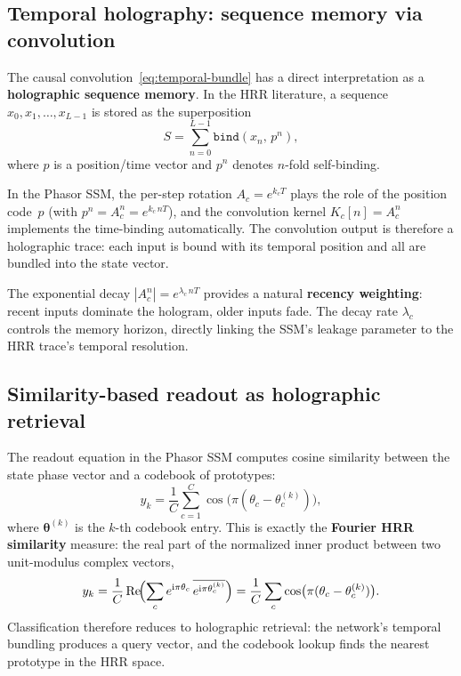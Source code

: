 \documentclass[11pt]{article}
\newcommand{\im}{\mathrm{i}}
\theoremstyle{definition}
\begin{document}
\subsection{Temporal holography: sequence memory via convolution}

The causal convolution~\eqref{eq:temporal-bundle} has a direct
interpretation as a \textbf{holographic sequence memory}.
In the HRR literature, a sequence $x_0, x_1, \dots, x_{L-1}$
is stored as the superposition
\begin{equation}\label{eq:hrr-trace}
  S = \sum_{n=0}^{L-1} \texttt{bind}(x_n,\, p^n),
\end{equation}
where $p$ is a position/time vector and $p^n$ denotes $n$-fold
self-binding.

In the Phasor SSM, the per-step rotation $A_c = e^{k_c T}$ plays the
role of the position code~$p$ (with $p^n = A_c^n = e^{k_c\,nT}$),
and the convolution kernel $K_c[n] = A_c^n$ implements the
time-binding automatically. The convolution output is therefore
a holographic trace: each input is bound with its temporal position
and all are bundled into the state vector.

The exponential decay $|A_c^n| = e^{\lambda_c\,nT}$ provides a
natural \textbf{recency weighting}: recent inputs dominate the
hologram, older inputs fade. The decay rate $\lambda_c$ controls
the memory horizon, directly linking the SSM's leakage parameter
to the HRR trace's temporal resolution.

\subsection{Similarity-based readout as holographic retrieval}

The readout equation in the Phasor SSM computes cosine similarity
between the state phase vector and a codebook of prototypes:
\begin{equation}\label{eq:similarity-readout}
  y_k = \frac{1}{C}\sum_{c=1}^{C}
    \cos\!\bigl(\pi(\theta_c - \theta_c^{(k)})\bigr),
\end{equation}
where $\bm\theta^{(k)}$ is the $k$-th codebook entry.
This is exactly the \textbf{Fourier HRR similarity} measure:
the real part of the normalized inner product between two unit-modulus
complex vectors,
\[
  y_k = \frac{1}{C}\operatorname{Re}\!\Bigl(
    \sum_c e^{\im\pi\theta_c}\,\overline{e^{\im\pi\theta_c^{(k)}}}
  \Bigr)
  = \frac{1}{C}\sum_c \cos\bigl(\pi(\theta_c - \theta_c^{(k)})\bigr).
\]
Classification therefore reduces to holographic retrieval:
the network's temporal bundling produces a query vector, and the
codebook lookup finds the nearest prototype in the HRR space.
\end{document}

